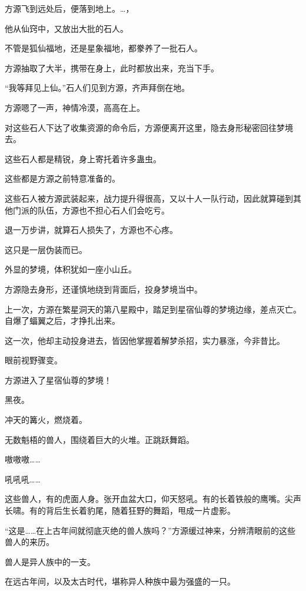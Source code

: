 
\begin{this_body}



方源飞到远处后，便落到地上。…，

他从仙窍中，又放出大批的石人。

不管是狐仙福地，还是星象福地，都豢养了一批石人。

方源抽取了大半，携带在身上，此时都放出来，充当下手。

“我等拜见上仙。”石人们见到方源，齐声拜倒在地。

方源嗯了一声，神情冷漠，高高在上。

对这些石人下达了收集资源的命令后，方源便离开这里，隐去身形秘密回往梦境去。

这些石人都是精锐，身上寄托着许多蛊虫。

这些都是方源之前特意准备的。

这些石人被方源武装起来，战力提升得很高，又以十人一队行动，因此就算碰到其他门派的队伍，方源也不担心石人们会吃亏。

退一万步讲，就算石人损失了，方源也不心疼。

这只是一层伪装而已。

外显的梦境，体积犹如一座小山丘。

方源隐去身形，还谨慎地绕到背面后，投身梦境当中。

上一次，方源在繁星洞天的第八星殿中，踏足到星宿仙尊的梦境边缘，差点灭亡。自爆了蝠翼之后，才挣扎出来。

这一次，他却主动投身进去，皆因他掌握着解梦杀招，实力暴涨，今非昔比。

眼前视野骤变。

方源进入了星宿仙尊的梦境！

黑夜。

冲天的篝火，燃烧着。

无数魁梧的兽人，围绕着巨大的火堆。正跳跃舞蹈。

嗷嗷嗷……

吼吼吼……

这些兽人，有的虎面人身。张开血盆大口，仰天怒吼。有的长着铁般的鹰嘴。尖声长啸。有的背后生长着豹尾，随着狂野的舞蹈，甩成一片虚影。

“这是……在上古年间就彻底灭绝的兽人族吗？”方源缓过神来，分辨清眼前的这些兽人的来历。

兽人是异人族中的一支。

在远古年间，以及太古时代，堪称异人种族中最为强盛的一只。


\end{this_body}
